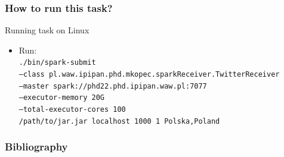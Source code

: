 \documentclass{beamer}
\begin{document}
\begin{frame}
\frametitle{How to run this task?}

\begin{block}{Running task on Linux}
	\begin{itemize}
		\item Run: \\
		\texttt{./bin/spark-submit \\
  --class pl.waw.ipipan.phd.mkopec.sparkReceiver.TwitterReceiver \\
  --master spark://phd22.phd.ipipan.waw.pl:7077 \\
  --executor-memory 20G \\
  --total-executor-cores 100 \\
  /path/to/jar.jar localhost 1000 1 Polska,Poland}
	\end{itemize}
\end{block}

\end{frame}



\begin{frame}[allowframebreaks]
	\frametitle<presentation>{Bibliography}
	\nocite{*}
	
	\tiny
	
\end{frame}
\end{document}
